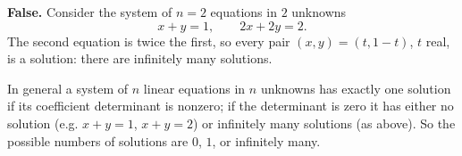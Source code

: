 \textbf{False.} Consider the system of \(n=2\) equations in \(2\) unknowns
\[
x+y=1,\qquad 2x+2y=2 .
\]
The second equation is twice the first, so every pair \((x,y)=(t,1-t)\), \(t\) real, is a solution: there are infinitely many solutions.

In general a system of \(n\) linear equations in \(n\) unknowns has exactly one solution if its coefficient determinant is nonzero; if the determinant is zero it has either no solution (e.g. \(x+y=1\), \(x+y=2\)) or infinitely many solutions (as above). So the possible numbers of solutions are \(0\), \(1\), or infinitely many.
